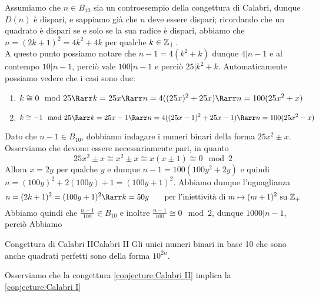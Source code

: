 \documentclass{article}
\begin{document}
Assumiamo che $n \in B_{10}$ sia un controesempio della congettura di Calabri, dunque $D(n)$ è dispari, e sappiamo già che $n$ deve essere dispari; ricordando che un quadrato è dispari se e solo se la sua radice è dispari, abbiamo che $n = (2k+1)^2 = 4k^2 + 4k$ per qualche $k \in \mathbb{Z}_+$.\\
A questo punto possiamo notare che $n-1 = 4(k^2 + k)$ dunque $4|n-1$ e al contempo $10| n-1$, perciò vale $100|n-1$ e perciò $25 | k^2 + k$. Automaticamente possiamo vedere che i casi sono due:
\begin{enumerate}
    \item \[ k \cong 0 \mod 25  \Rarr k = 25x \Rarr n = 4((25x)^2 + 25x) \Rarr n = 100(25x^2 + x )\]
    \item \[ k \cong -1 \mod 25 \Rarr k = 25x-1 \Rarr n = 4((25x-1)^2 + 25x - 1) \Rarr n = 100(25x^2 - x) \]
\end{enumerate}

Dato che $n-1 \in B_{10}$, dobbiamo indagare i numeri binari della forma $25x^2 \pm x$. Osserviamo che devono essere necessariamente pari, in quanto
\[ 25x^2 \pm x \cong x^2 \pm x \cong x(x \pm 1) \cong 0 \mod 2 \]
Allora $x = 2y$ per qualche $y$ e dunque $n-1 = 100(100y^2 + 2y)$ e quindi $n = (100y)^2 + 2(100y) + 1 = (100y +1)^2$. Abbiamo dunque l'uguaglianza
\[ n = (2k+1)^2 = (100y + 1)^2 \Rarr k = 50y \qquad \text{per l'iniettività di } m \mapsto (m+1)^2 \text{ su } \Z_+\] 
Abbiamo quindi che $\frac{n-1}{100} \in B_{10}$ e inoltre $\frac{n-1}{100} \cong 0 \mod 2$, dunque 
$1000|n-1$, perciò Abbiamo

\begin{conjecture}{Congettura di Calabri II}{Calabri II}
    Gli unici numeri binari in base 10 che sono anche quadrati perfetti sono della forma $10^{2n}$.
\end{conjecture}
Osserviamo che la congettura \ref{conjecture:Calabri II} implica la \ref{conjecture:Calabri I}

\end{document}
